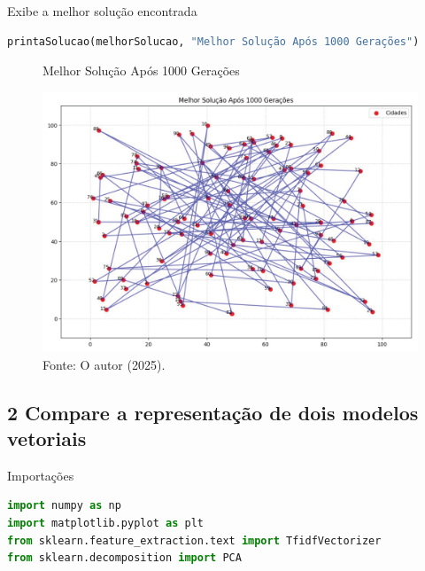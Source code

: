 Exibe a melhor solução encontrada

\begin{lstlisting}[language=Python, style=input]
printaSolucao(melhorSolucao, "Melhor Solução Após 1000 Gerações")
\end{lstlisting}

\begin{figure}[H]
\centering
\caption{Melhor Solução Após 1000 Gerações}
\includegraphics[width=1\linewidth]{apendices/fig/IAA015_2.png}
\caption*{Fonte: O autor (2025).}
\end{figure}

\subsection*{\textbf{2 Compare a representação de dois modelos vetoriais}}

Importações

\begin{lstlisting}[language=Python, style=input]
import numpy as np
import matplotlib.pyplot as plt
from sklearn.feature_extraction.text import TfidfVectorizer
from sklearn.decomposition import PCA
\end{lstlisting}

